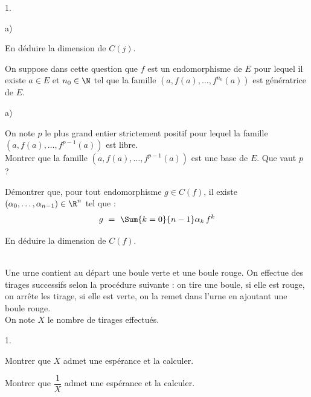 \documentclass[11pt]{article}%
\begin{document}
\begin{exerciceAP}
\begin{noliste}{1.}
\begin{noliste}{a)}
      \item En déduire la dimension de $C(j)$.
    \end{noliste}
    
  \item On suppose dans cette question que $f$ est un endomorphisme
    de $E$ pour lequel il existe $a \in E$ et $n_0 \in \N$ tel que
    la famille $(a, f(a), \ldots, f^{n_0}(a))$  est génératrice de $E$.
    \begin{noliste}{a)}
    \setlength{\itemsep}{2mm}
    \item On note $p$ le plus grand entier strictement positif pour
      lequel la famille $(a, f(a), \ldots, f^{p-1}(a))$ est libre.\\
      Montrer que la famille $(a, f(a), \ldots, f^{p-1}(a))$ est une
      base de $E$. Que vaut $p$ ?
      
    \item Démontrer que, pour tout endomorphisme $g \in C(f)$, il
      existe $(\alpha_0, \ldots, \alpha_{n-1}) \in \R^{n}$ tel que :
      \[
        g \ = \ \Sum{k=0}{n-1} \alpha_k \, f^k
      \]
      
    \item En déduire la dimension de $C(f)$.
    \end{noliste}
  \end{noliste}
\end{exerciceAP}



\begin{exerciceSP}~\\
  Une urne contient au départ une boule verte et une boule rouge.
  On effectue des tirages successifs selon la procédure suivante : 
  on tire une boule, si elle est rouge, on arrête les tirage, si elle
  est verte, on la remet dans l'urne en ajoutant une boule rouge.\\
  On note $X$ le nombre de tirages effectués.
  \begin{noliste}{1.}
    \setlength{\itemsep}{2mm}
  \item Montrer que $X$ admet une espérance et la calculer.
    
  \item Montrer que $\dfrac{1}{X}$ admet une espérance et la calculer.
  \end{noliste}
  
\end{exerciceSP}




\newpage
\end{document}
